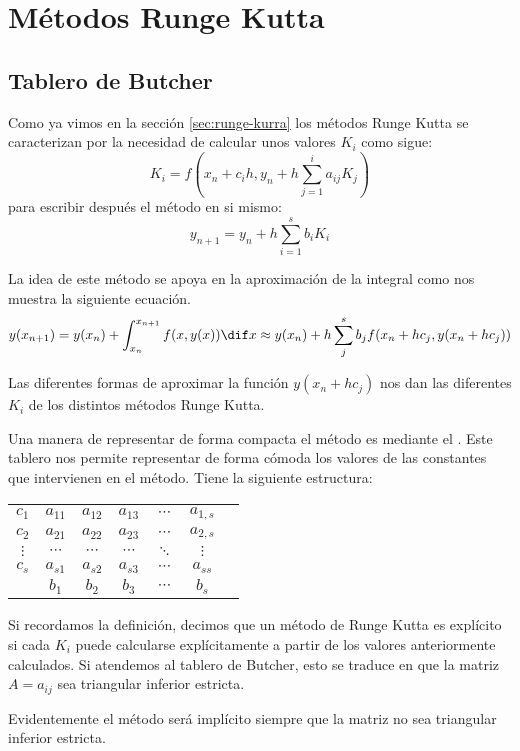\chapter{Métodos Runge Kutta}

\section{Tablero de Butcher}
Como ya vimos en la sección \ref{sec:runge-kurra} los métodos Runge Kutta se caracterizan por la necesidad de calcular unos valores $K_i$ como sigue:
\[K_i = f\left(x_n+c_ih, y_n+h \sum_{j=1}^ia_{ij}K_j\right)\]
para escribir después el método en si mismo:
\[y_{n+1} = y_n+ h \sum_{i=1}^s b_i K_i\]

La idea de este método se apoya en la aproximación de la integral como nos muestra la siguiente ecuación.
\[y(x_{n+1}) = y(x_n) + \int_{x_n}^{x_{n+1}} f(x,y(x))\dif x \approx y(x_n)+h \sum_{j}^{s} b_j f(x_n+hc_j, y(x_n+hc_j))\]

Las diferentes formas de aproximar la función $y(x_n+hc_j)$ nos dan las diferentes $K_i$ de los distintos métodos Runge Kutta.

Una manera de representar de forma compacta el método es mediante el . Este tablero nos permite representar de forma cómoda los valores de las constantes que intervienen en el método. Tiene la siguiente estructura:

\begin{center}
\begin{tabular}{c|cccccc}
$c_1$ & $a_{11}$ & $a_{12}$ & $a_{13}$ & $\cdots$ & $a_{1,s}$\\
$c_2$ & $a_{21}$ & $a_{22}$ & $a_{23}$ & $\cdots$ & $a_{2,s}$\\
$\vdots$ & $\cdots$ & $\cdots$ & $\cdots$ & $\ddots$ & $\vdots$ \\
$c_s$ & $a_{s1}$ & $a_{s2}$ & $a_{s3}$ & $\cdots$ & $a_{ss}$\\
\hline
 & $b_1$ & $b_2$ & $b_3$ & $\cdots$ & $b_s$\\
\end{tabular}
\end{center}

Si recordamos la definición, decimos que un método de Runge Kutta es explícito si cada $K_i$ puede calcularse explícitamente a partir de los valores anteriormente calculados. Si atendemos al tablero de Butcher, esto se traduce en que la matriz $A = a_{ij}$ sea triangular inferior estricta.

Evidentemente el método será implícito siempre que la matriz no sea triangular inferior estricta.

